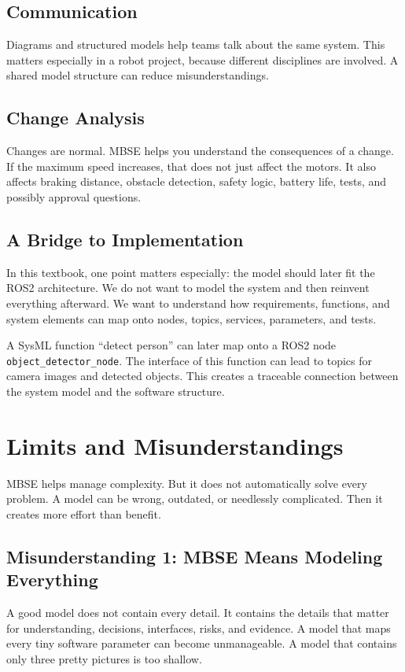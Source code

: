 \subsection{Communication}
Diagrams and structured models help teams talk about the same system. This matters especially in a robot project, because different disciplines are involved. A shared model structure can reduce misunderstandings.

\subsection{Change Analysis}
Changes are normal. MBSE helps you understand the consequences of a change. If the maximum speed increases, that does not just affect the motors. It also affects braking distance, obstacle detection, safety logic, battery life, tests, and possibly approval questions.

\subsection{A Bridge to Implementation}
In this textbook, one point matters especially: the model should later fit the ROS2 architecture. We do not want to model the system and then reinvent everything afterward. We want to understand how requirements, functions, and system elements can map onto nodes, topics, services, parameters, and tests.

\begin{praxisbox}
A SysML function \enquote{detect person} can later map onto a ROS2 node \texttt{object\_detector\_node}. The interface of this function can lead to topics for camera images and detected objects. This creates a traceable connection between the system model and the software structure.
\end{praxisbox}

\section{Limits and Misunderstandings}
MBSE helps manage complexity. But it does not automatically solve every problem. A model can be wrong, outdated, or needlessly complicated. Then it creates more effort than benefit.

\subsection{Misunderstanding 1: MBSE Means Modeling Everything}
A good model does not contain every detail. It contains the details that matter for understanding, decisions, interfaces, risks, and evidence. A model that maps every tiny software parameter can become unmanageable. A model that contains only three pretty pictures is too shallow.

